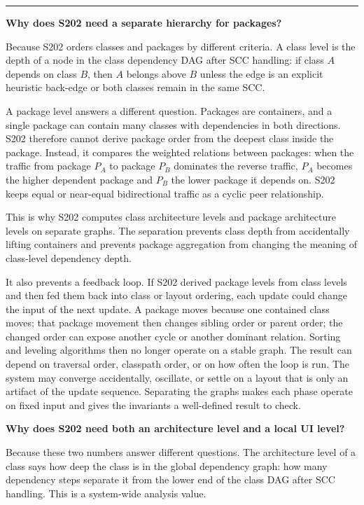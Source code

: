 \documentclass[a4paper,twoside]{article}
\begin{document}
\noindent\rule{\textwidth}{0.4pt}
\vspace{0.75em}

\textbf{Why does S202 need a separate hierarchy for packages?}

Because S202 orders classes and packages by different criteria. A class level
is the depth of a node in the class dependency DAG after SCC handling: if class
$A$ depends on class $B$, then $A$ belongs above $B$ unless the edge is an
explicit heuristic back-edge or both classes remain in the same SCC.

A package level answers a different question. Packages are containers, and a
single package can contain many classes with dependencies in both directions.
S202 therefore cannot derive package order from the deepest class inside the
package. Instead, it compares the weighted relations between packages: when
the traffic from package $P_A$ to package $P_B$ dominates the reverse traffic,
$P_A$ becomes the higher dependent package and $P_B$ the lower package
it depends on. S202 keeps equal or near-equal bidirectional traffic as a cyclic
peer relationship.

This is why S202 computes class architecture levels and package architecture
levels on separate graphs. The separation prevents class depth from
accidentally lifting containers and prevents package aggregation from changing
the meaning of class-level dependency depth.

It also prevents a feedback loop. If S202 derived package levels from class
levels and then fed them back into class or layout ordering, each update could change
the input of the next update. A package moves because one contained class moves;
that package movement then changes sibling order or parent order; the changed
order can expose another cycle or another dominant relation. Sorting and
leveling algorithms then no longer operate on a stable graph. The result can
depend on traversal order, classpath order, or on how often the loop is run.
The system may converge accidentally, oscillate, or settle on a layout that is
only an artifact of the update sequence. Separating the graphs makes each phase
operate on fixed input and gives the invariants a well-defined result to check.

\textbf{Why does S202 need both an architecture level and a local UI level?}

Because these two numbers answer different questions. The architecture level
of a class says how deep the class is in the global dependency graph: how many
dependency steps separate it from the lower end of the class DAG after SCC
handling. This is a system-wide analysis value.
\end{document}
